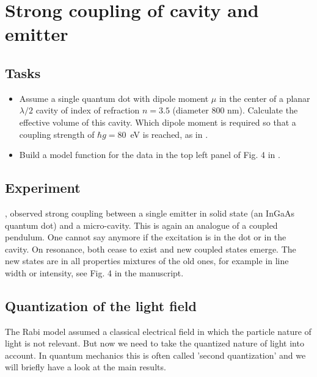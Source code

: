 \renewcommand{\lastmod}{June 18, 2021}
\renewcommand{\chapterauthors}{Markus Lippitz}


\chapter{Strong coupling of cavity and emitter}




\section{Tasks}

\begin{itemize}
\item Assume a single quantum dot with dipole moment $\mu$  in the center of a planar $\lambda/2$ cavity of index of refraction $n=3.5$  (diameter 800 nm). Calculate the effective volume of this cavity.
Which dipole moment is required so that a coupling strength of $\hbar g = 80$~\textmu eV is reached, as in \cite{Reithmaier04}. 

\item Build a model function for the data in the top left panel of Fig. 4 in \cite{Reithmaier04}. 

\end{itemize}



\section{Experiment}

\cite{Reithmaier04}, observed strong coupling between a single emitter in solid state (an InGaAs quantum dot) and a micro-cavity. This is again an analogue of a coupled pendulum. One cannot say anymore if the excitation is in the dot or in the cavity. On resonance, both cease to exist and new coupled states emerge. The new states are in all properties mixtures of the old ones, for example in line width or intensity, see Fig. 4 in the manuscript.

\section{Quantization of the light field}
The Rabi model assumed a classical electrical field in which the particle nature of light is not relevant. But now we need to take the quantized nature of light into account. In quantum mechanics this is often called 'second quantization' and we will briefly have a look at the main results.


